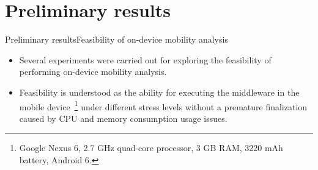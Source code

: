 \documentclass[9pt,xcolor={dvipsnames},handout]{beamer}
\begin{document}
\section{Preliminary results}
\begin{frame}{Preliminary results}{Feasibility of on-device mobility analysis}
{
  \small{}
\begin{itemize}
  \item Several experiments were carried out for exploring the feasibility of performing on-device mobility analysis.
  \item Feasibility is understood as the ability for executing the middleware in the mobile device~\footnote{\scriptsize Google Nexus 6, 2.7 GHz quad-core processor, 3 GB RAM, 3220 mAh battery, Android 6.} under different stress levels without a premature finalization caused by CPU and memory consumption usage issues.
\end{itemize}
}

\begin{table}
\centering
\caption{Summary of results of first experiment (SP = stay point).}
\label{tbl:experiment-1}
\end{table}
\end{frame}
\end{document}
